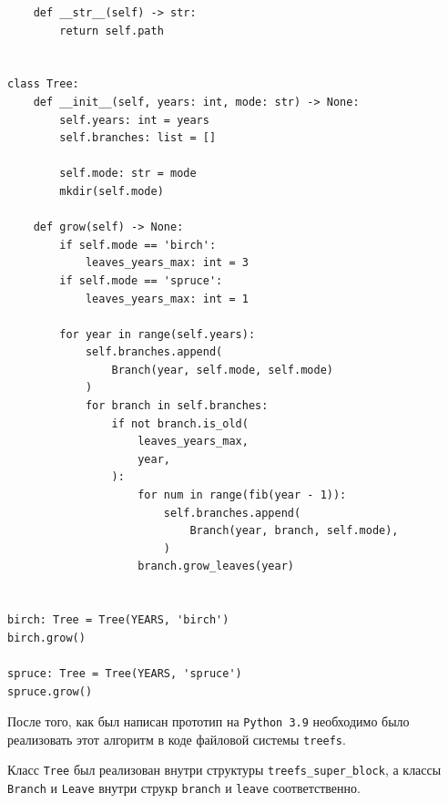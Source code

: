 \documentclass{article}
\begin{document}
\begin{lstlisting}
    def __str__(self) -> str:
        return self.path


class Tree:
    def __init__(self, years: int, mode: str) -> None:
        self.years: int = years
        self.branches: list = []

        self.mode: str = mode
        mkdir(self.mode)
    
    def grow(self) -> None:
        if self.mode == 'birch':
            leaves_years_max: int = 3
        if self.mode == 'spruce':
            leaves_years_max: int = 1
        
        for year in range(self.years):
            self.branches.append(
                Branch(year, self.mode, self.mode)
            )
            for branch in self.branches:
                if not branch.is_old(
                    leaves_years_max, 
                    year,
                ):
                    for num in range(fib(year - 1)):
                        self.branches.append(
                            Branch(year, branch, self.mode),
                        )
                    branch.grow_leaves(year)

    
birch: Tree = Tree(YEARS, 'birch')
birch.grow()

spruce: Tree = Tree(YEARS, 'spruce')
spruce.grow()
    \end{lstlisting}

    После того, как был написан прототип на \texttt{Python 3.9} необходимо было
    реализовать этот алгоритм в коде файловой системы \texttt{treefs}.

    Класс \texttt{Tree} был реализован внутри структуры \texttt{treefs\_super\_block},
    а классы \texttt{Branch} и \texttt{Leave} внутри струкр \texttt{branch} и
    \texttt{leave} соответственно.
\end{document}
